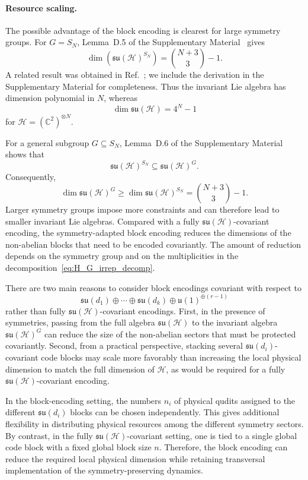 \documentclass[10pt,twocolumn,superscriptaddress,aps,amsmath,amssymb,citeautoscript,floatfix,prx]{revtex4-2}
\newcounter{alg}
\theoremstyle{plain}
\theoremstyle{plain}
\theoremstyle{plain}
\theoremstyle{plain}
\theoremstyle{plain}
\theoremstyle{plain}
\begin{document}
\paragraph{Resource scaling.}

The possible advantage of the block encoding is clearest for large symmetry groups. For $G=S_N$, Lemma~D.5 of the Supplementary Material~\cite{SuppMat} gives
$$
\dim\left(\mathfrak{su}(\mathcal H)^{S_N}\right)
=
\binom{N+3}{3}
-
1 .
$$
A related result was obtained in Ref.~\cite{Albertini2018}; we include the derivation in the Supplementary Material for completeness. Thus the invariant Lie algebra has dimension polynomial in $N$, whereas
$$
\dim\mathfrak{su}(\mathcal H)
=
4^N-1
$$
for $\mathcal H=(\mathbb C^2)^{\otimes N}$.

For a general subgroup $G\subseteq S_N$, Lemma~D.6 of the Supplementary Material~\cite{SuppMat} shows that
$$
\mathfrak{su}(\mathcal H)^{S_N}
\subseteq
\mathfrak{su}(\mathcal H)^G .
$$
Consequently,
\begin{equation}\label{eq:inv_alg_dim}
\dim\mathfrak{su}(\mathcal H)^G
\ge
\dim\mathfrak{su}(\mathcal H)^{S_N}
=
\binom{N+3}{3}
-
1 .
\end{equation}
Larger symmetry groups impose more constraints and can therefore lead to smaller invariant Lie algebras. Compared with a fully $\mathfrak{su}(\mathcal H)$-covariant encoding, the symmetry-adapted block encoding reduces the dimensions of the non-abelian blocks that need to be encoded covariantly. The amount of reduction depends on the symmetry group and on the multiplicities in the decomposition~\eqref{eq:H_G_irrep_decomp}.

There are two main reasons to consider block encodings covariant with respect to
$$
\mathfrak{su}(d_1)
\oplus
\cdots
\oplus
\mathfrak{su}(d_k)
\oplus
\mathfrak{u}(1)^{\oplus(r-1)}
$$
rather than fully $\mathfrak{su}(\mathcal H)$-covariant encodings. First, in the presence of symmetries, passing from the full algebra $\mathfrak{su}(\mathcal H)$ to the invariant algebra $\mathfrak{su}(\mathcal H)^G$ can reduce the size of the non-abelian sectors that must be protected covariantly. Second, from a practical perspective, stacking several $\mathfrak{su}(d_i)$-covariant code blocks may scale more favorably than increasing the local physical dimension to match the full dimension of $\mathcal H$, as would be required for a fully $\mathfrak{su}(\mathcal H)$-covariant encoding.

In the block-encoding setting, the numbers $n_i$ of physical qudits assigned to the different $\mathfrak{su}(d_i)$ blocks can be chosen independently. This gives additional flexibility in distributing physical resources among the different symmetry sectors. By contrast, in the fully $\mathfrak{su}(\mathcal H)$-covariant setting, one is tied to a single global code block with a fixed global block size $n$. Therefore, the block encoding can reduce the required local physical dimension while retaining transversal implementation of the symmetry-preserving dynamics.
\end{document}
